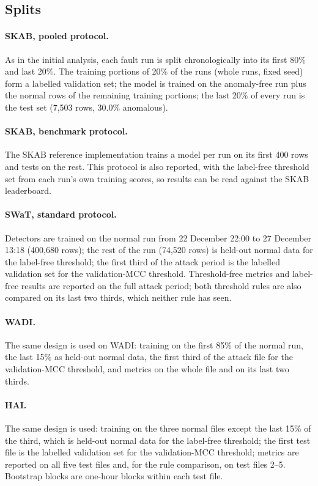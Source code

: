 \documentclass[11pt]{article}
\begin{document}
\subsection{Splits}
\paragraph{SKAB, pooled protocol.} As in the initial analysis, each fault run is
split chronologically into its first 80\% and last 20\%. The training portions of
20\% of the runs (whole runs, fixed seed) form a labelled validation set; the
model is trained on the anomaly-free run plus the normal rows of the remaining
training portions; the last 20\% of every run is the test set (7{,}503 rows,
30.0\% anomalous).
\paragraph{SKAB, benchmark protocol.} The SKAB reference implementation trains
a model per run on its first 400 rows and tests on the rest. This protocol is
also reported, with the label-free threshold set from each run's own training
scores, so results can be read against the SKAB leaderboard.
\paragraph{SWaT, standard protocol.} Detectors are trained on the normal run
from 22 December 22:00 to 27 December 13:18 (400{,}680 rows); the rest of the run
(74{,}520 rows) is held-out normal data
for the label-free threshold; the first third of the attack period is the
labelled validation set for the validation-MCC threshold. Threshold-free metrics
and label-free results are reported on the full attack period; both threshold
rules are also compared on its last two thirds, which neither rule has seen.
\paragraph{WADI.} The same design is used on WADI: training on the first 85\% of the
normal run, the last 15\% as held-out normal data, the first third of the attack file
for the validation-MCC threshold, and metrics on the whole file and on its last two
thirds.
\paragraph{HAI.} The same design is used: training on the three normal files except
the last 15\% of the third, which is held-out normal data for the label-free
threshold; the first test file is the labelled validation set for the
validation-MCC threshold; metrics are reported on all five test files and, for the
rule comparison, on test files 2--5. Bootstrap blocks are one-hour blocks within
each test file.
\end{document}
